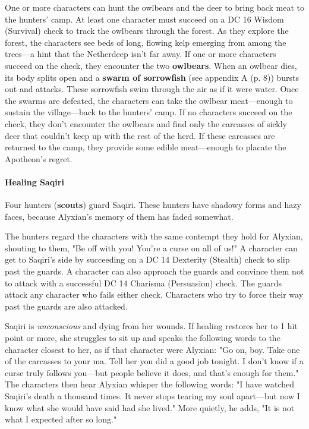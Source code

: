 \documentclass[a4paper, 11pt, bg=full, twocolumn, nooutline]{dndbook}
\begin{document}
One or more characters can hunt the owlbears and the deer to bring back meat to the hunters' camp. At least one character must succeed on a DC 16 Wisdom (Survival) check to track the owlbears through the forest. As they explore the forest, the characters see beds of long, flowing kelp emerging from among the trees---a hint that the Netherdeep isn't far away. If one or more characters succeed on the check, they encounter the two \textbf{owlbears}. When an owlbear dies, its body splits open and a \textbf{swarm of sorrowfish} (see appendix A (p. 8)) bursts out and attacks. These sorrowfish swim through the air as if it were water. Once the swarms are defeated, the characters can take the owlbear meat---enough to sustain the village---back to the hunters' camp. If no characters succeed on the check, they don't encounter the owlbears and find only the carcasses of sickly deer that couldn't keep up with the rest of the herd. If these carcasses are returned to the camp, they provide some edible meat---enough to placate the Apotheon's regret.

\paragraph{Healing Saqiri}

Four hunters (\textbf{scouts}) guard Saqiri. These hunters have shadowy forms and hazy faces, because Alyxian's memory of them has faded somewhat.

The hunters regard the characters with the same contempt they hold for Alyxian, shouting to them, "Be off with you! You're a curse on all of us!" A character can get to Saqiri's side by succeeding on a DC 14 Dexterity (Stealth) check to slip past the guards. A character can also approach the guards and convince them not to attack with a successful DC 14 Charisma (Persuasion) check. The guards attack any character who fails either check. Characters who try to force their way past the guards are also attacked.

Saqiri is \textit{unconscious} and dying from her wounds. If healing restores her to 1 hit point or more, she struggles to sit up and speaks the following words to the character closest to her, as if that character were Alyxian: "Go on, boy. Take one of the carcasses to your ma. Tell her you did a good job tonight. I don't know if a curse truly follows you---but people believe it does, and that's enough for them." The characters then hear Alyxian whisper the following words: "I have watched Saqiri's death a thousand times. It never stops tearing my soul apart---but now I know what she would have said had she lived." More quietly, he adds, "It is not what I expected after so long."
\end{document}
